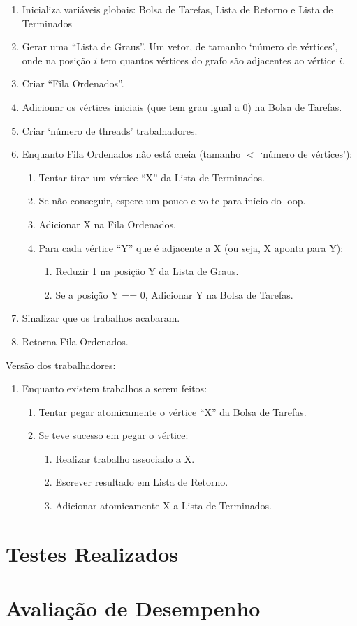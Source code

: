 \documentclass[12pt]{article}
\begin{document}
\begin{enumerate}
	\item Inicializa variáveis globais:
		Bolsa de Tarefas, Lista de Retorno e Lista de Terminados
	\item Gerar uma ``Lista de Graus''.
		Um vetor, de tamanho `número de vértices',
		onde na posição $i$ tem quantos vértices do grafo são adjacentes
		ao vértice $i$.
	\item Criar ``Fila Ordenados''.
	\item Adicionar os vértices iniciais (que tem grau igual a 0)
		na Bolsa de Tarefas.
	\item Criar `número de threads' trabalhadores.
	\item Enquanto Fila Ordenados não está cheia
		(tamanho $<$ `número de vértices'):
	\begin{enumerate}
		\item Tentar tirar um vértice ``X'' da Lista de Terminados.
		\item Se não conseguir, espere um pouco e volte para início do loop.
		\item Adicionar X na Fila Ordenados.
		\item Para cada vértice ``Y'' que é adjacente a X
			(ou seja, X aponta para Y):
		\begin{enumerate}
			\item Reduzir 1 na posição Y da Lista de Graus.
			\item Se a posição Y == 0, Adicionar Y na Bolsa de Tarefas.
		\end{enumerate}
	\end{enumerate}
	\item Sinalizar que os trabalhos acabaram.
	\item Retorna Fila Ordenados.
\end{enumerate}

Versão dos trabalhadores:

\begin{enumerate}
	\item Enquanto existem trabalhos a serem feitos:
	\begin{enumerate}
		\item Tentar pegar atomicamente o vértice ``X''
			da Bolsa de Tarefas.
		\item Se teve sucesso em pegar o vértice:
		\begin{enumerate}
			\item Realizar trabalho associado a X.
			\item Escrever resultado em Lista de Retorno.
			\item Adicionar atomicamente X a Lista de Terminados.
		\end{enumerate}
	\end{enumerate}
\end{enumerate}

\newpage
\section{Testes Realizados}

\newpage
\section{Avaliação de Desempenho}
\end{document}
